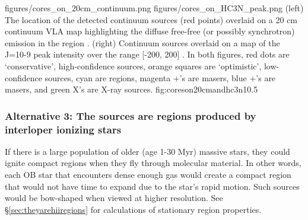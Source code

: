 \documentclass[twocolumn]{aastex61}
\begin{document}

%

\FigureTwo
{figures/cores_on_20cm_continuum.png}
{figures/cores_on_HC3N_peak.png}
{(left) The location of the detected continuum sources (red points) overlaid on a 20
cm continuum VLA map highlighting the diffuse free-free (or possibly
synchrotron) emission in the region \citep{Yusef-Zadeh2004a}.
(right) Continuum sources overlaid on a map
of the \cyanoacetylene J=10-9 peak intensity over the range [-200, 200] \kms.
  In both figures, red
dots are `conservative',
high-confidence sources, orange squares are `optimistic', low-confidence sources,
cyan are \hii regions, magenta +'s are \methanol masers, blue +'s are \water
masers, and green X's are X-ray sources.
}
{fig:coreson20cmandhc3n}{1}{0.5\textwidth}

\subsubsection{Alternative 3: The sources are \hii regions produced by
interloper ionizing stars}
\label{sec:alt2}
If there is a large population of older (age 1-30 Myr) massive stars, they
could ignite compact \hii regions when they fly through molecular material.  In
other words, each OB star that encounters dense enough gas would create a
compact \hii region that would not have time to expand due to the star's rapid
motion.  Such sources would be bow-shaped when viewed at higher resolution.
See \S \ref{sec:theyarehiiregions} for calculations of stationary \hii region
properties.
\end{document}
